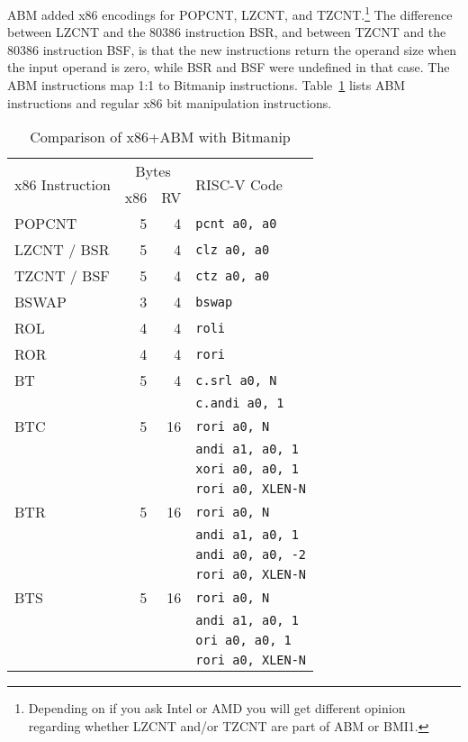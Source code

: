 ABM added x86 encodings for POPCNT, LZCNT, and TZCNT.\footnote{Depending on if
you ask Intel or AMD you will get different opinion regarding whether LZCNT
and/or TZCNT are part of ABM or BMI1.} The difference between LZCNT and the
80386 instruction BSR, and between TZCNT and the 80386 instruction BSF, is that
the new instructions return the operand size when the input operand is zero,
while BSR and BSF were undefined in that case. The ABM instructions map 1:1 to
Bitmanip instructions. Table~\ref{abm-comp} lists ABM instructions and regular
x86 bit manipulation instructions.

\begin{table}[h]
\centering
\begin{tabular}{lrrl}
\multirow{2}{*}{x86 Instruction} & \multicolumn{2}{c}{Bytes} & \multirow{2}{*}{RISC-V Code} \\
& x86 & RV & \\
\hline
POPCNT       &   5 &  4 & {\tt pcnt a0, a0} \\
\hline
LZCNT / BSR  &   5 &  4 & {\tt clz a0, a0} \\
\hline
TZCNT / BSF  &   5 &  4 & {\tt ctz a0, a0} \\
\hline
BSWAP        &   3 &  4 & {\tt bswap} \\
\hline
ROL          &   4 &  4 & {\tt roli} \\
\hline
ROR          &   4 &  4 & {\tt rori} \\
\hline
BT           &   5 &  4 & {\tt c.srl a0, N} \\
             &     &    & {\tt c.andi a0, 1} \\
\hline
BTC          &   5 & 16 & {\tt rori a0, N} \\
             &     &    & {\tt andi a1, a0, 1} \\
             &     &    & {\tt xori a0, a0, 1} \\
             &     &    & {\tt rori a0, XLEN-N} \\
\hline
BTR          &   5 & 16 & {\tt rori a0, N} \\
             &     &    & {\tt andi a1, a0, 1} \\
             &     &    & {\tt andi a0, a0, -2} \\
             &     &    & {\tt rori a0, XLEN-N} \\
\hline
BTS          &   5 & 16 & {\tt rori a0, N} \\
             &     &    & {\tt andi a1, a0, 1} \\
             &     &    & {\tt ori a0, a0, 1} \\
             &     &    & {\tt rori a0, XLEN-N} \\
\end{tabular}
\caption{Comparison of x86+ABM with Bitmanip}
\label{abm-comp}
\end{table}

